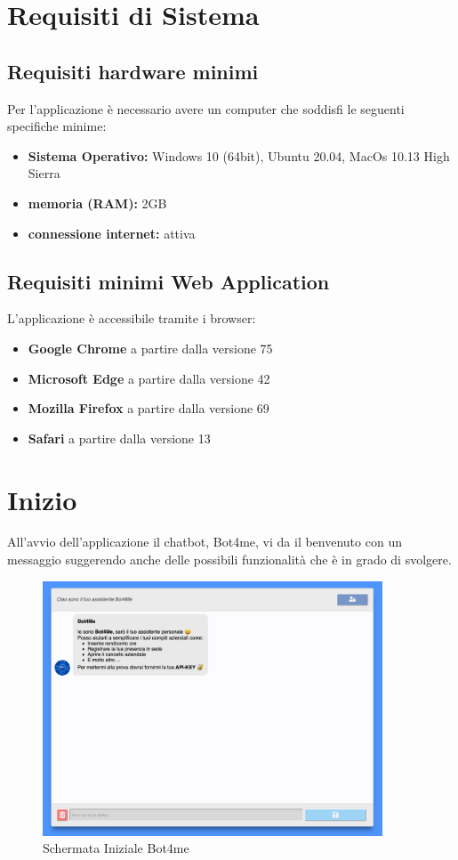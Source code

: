 \section{Requisiti di Sistema}
\subsection{Requisiti hardware minimi}
Per l'applicazione è necessario avere un computer che soddisfi le seguenti specifiche minime:
\begin{itemize}
    \item \textbf{Sistema Operativo:} Windows 10 (64bit), Ubuntu 20.04, MacOs 10.13 High Sierra
    \item \textbf{memoria (RAM):} 2GB
    \item \textbf{connessione internet:} attiva
\end{itemize}
\subsection{Requisiti minimi Web Application}
L'applicazione è accessibile tramite i browser:
\begin{itemize}
    \item \textbf{Google Chrome} a partire dalla versione 75
    \item \textbf{Microsoft Edge} a partire dalla versione 42
    \item \textbf{Mozilla Firefox} a partire dalla versione 69
    \item \textbf{Safari} a partire dalla versione 13
\end{itemize}

\newpage
\section{Inizio}
All'avvio dell'applicazione il chatbot, Bot4me, vi da il benvenuto con un messaggio suggerendo anche delle possibili funzionalità che è in grado di svolgere. 

\begin{figure}[H]
    \centering\includegraphics[width=0.9\textwidth, height=0.7\textheight, keepaspectratio]{images/schermata_avvio.png}
    \caption{Schermata Iniziale Bot4me}
\end{figure}

